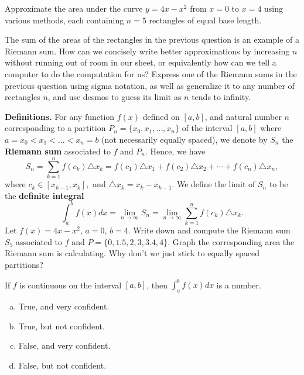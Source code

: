 \documentclass[answers]{exam}
\begin{document}
	
	\begin{questions}
		
		\question Approximate the area under the curve $y = 4x-x^2$ from $x = 0$ to $x = 4$ using various methods, each containing $n = 5$ rectangles of equal base length. \\
		
		\hfill \break
		\hfill \break
		\hfill \break
		\hfill \break
		\hfill \break
		\hfill \break
		\hfill \break
		\hfill \break
		\hfill \break
		\hfill \break
		\hfill \break
		\hfill \break
		\hfill \break
		\hfill \break
		\hfill \break
		
		\question The sum of the areas of the rectangles in the previous question is an example of a Riemann sum. How can we concisely write better approximations by increasing $n$ without running out of room in our sheet, or equivalently how can we tell a computer to do the computation for us? Express one of the Riemann sums in the previous question using sigma notation, as well as generalize it to any number of rectangles $n$, and use desmos to guess its limit as $n$ tends to infinity.
		
		\hfill \break
		\hfill \break
		\hfill \break
		\hfill \break
		\hfill \break
		\hfill \break
		\hfill \break
		\hfill \break
		\hfill \break
		\hfill \break
		
		
		\newpage
		
		\question \textbf{Definitions.} For any function $f(x)$ defined on $[a,b]$, and natural number $n$ corresponding to a partition $P_n =\{x_0, x_1, \dots, x_n\}$ of the interval $[a,b]$ where $a = x_0 < x_1 < \dots < x_n = b$ (not necessarily equally spaced), we denote by $S_n$ the \textbf{Riemann sum} associated to $f$ and $P_n$. Hence, we have
			\[S_n = \sum_{k=1}^{n} f(c_k)\triangle x_k = f(c_1)\triangle x_1+ f(c_2)\triangle x_2 + \cdots + f(c_n)\triangle x_n, \] 
		where $c_k \in [x_{k-1},x_k],$ and $\triangle x_k = x_k - x_{k-1}$. We define the limit of $S_n$ to be the \textbf{definite integral}  
		\[ \displaystyle \int_a^b f(x) dx = \lim_{n\to \infty} S_n = \lim_{n\to \infty} \sum_{k=1}^{n} f(c_k)\triangle x_k.\] 
		Let $f(x) = 4x-x^2$, $a = 0$, $b = 4$. Write down and compute the Riemann sum $S_5$ associated to $f$ and $P = \{0, 1.5, 2, 3, 3.4, 4\}$. Graph the corresponding area the Riemann sum is calculating. Why don't we just stick to equally spaced partitions?

\vspace{2in}

		\question If $f$ is continuous on the interval $[a, b]$, then $\int_a^b f(x) dx$ is a number.
		\begin{enumerate}[(a)]
		\item True, and very confident.
		\item True, but not confident.
		\item False, and very confident.
		\item False, but not confident.
		\end{enumerate}
		

\end{questions}
\end{document}
